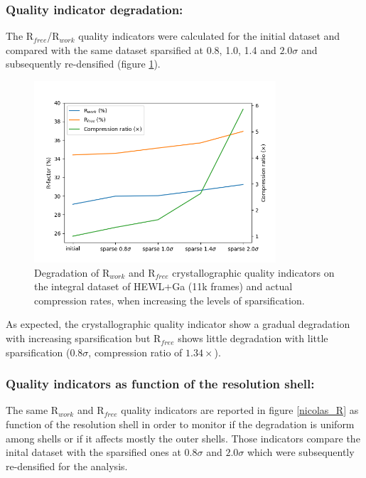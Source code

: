 \documentclass[preprint]{iucr}              %
\begin{document}
\subsubsection{Quality indicator degradation:}
The R$_{free}$/R$_{work}$ quality indicators \cite{Rfree} were calculated for the initial dataset and compared with the same dataset sparsified at 0.8, 1.0, 1.4 and $2.0\sigma$ and subsequently re-densified (figure \ref{Rfree}). 

\begin{figure}
\label{Rfree}
\begin{center}
\includegraphics[width=9cm]{fig_Rfree}
\caption{Degradation of R$_{work}$ and R$_{free}$ crystallographic quality indicators on the integral dataset of HEWL+Ga (11k frames) and actual compression rates, when increasing the levels of sparsification.}
\end{center}
\end{figure}
As expected, the crystallographic quality indicator show a gradual degradation with increasing sparsification but R$_{free}$ shows little degradation with little sparsification ($0.8\sigma$, compression ratio of $1.34\times$).

\subsubsection{Quality indicators as function of the resolution shell:}
The same R$_{work}$ and R$_{free}$ quality indicators are reported in figure \ref{nicolas_R} as function of the resolution shell in order to monitor if the degradation is uniform among shells or if it affects mostly the outer shells.
Those indicators compare the inital dataset with the sparsified ones at $0.8\sigma$ and $2.0\sigma$ which were subsequently re-densified for the analysis.
\end{document}
